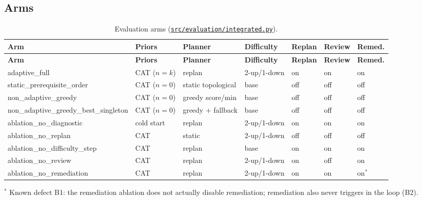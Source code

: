\documentclass[english]{sintr}
\newcommand{\repourl}{https://github.com/Bhuvan-56/adaptive-learning-path-planner-DAT}
\newcommand{\sha}{cs5903-final-2026}
\DeclareRobustCommand{\rf}[1]{\href{\repourl/blob/\sha/#1}{\nolinkurl{#1}}}
\begin{document}
\subsection{Arms}
{\small
\begin{longtable}{|L{3.6cm}|L{1.75cm}|L{2.2cm}|L{1.75cm}|C{1.2cm}|C{1.2cm}|C{1.25cm}|}
\caption{Evaluation arms (\rf{src/evaluation/integrated.py}).}\\
\hline
\textbf{Arm} & \textbf{Priors} & \textbf{Planner} & \textbf{Difficulty} & \textbf{Replan} & \textbf{Review} & \textbf{Remed.} \\ \hline
\endfirsthead
\hline \textbf{Arm} & \textbf{Priors} & \textbf{Planner} & \textbf{Difficulty} & \textbf{Replan} & \textbf{Review} & \textbf{Remed.} \\ \hline
\endhead
adaptive\_\allowbreak full & CAT ($n=k$) & replan & 2-up/1-down & on & on & on \\ \hline
static\_\allowbreak prerequisite\_\allowbreak order & CAT ($n=0$) & static topological & base & off & off & off \\ \hline
non\_\allowbreak adaptive\_\allowbreak greedy & CAT ($n=0$) & greedy score/min & base & off & off & off \\ \hline
non\_\allowbreak adaptive\_\allowbreak greedy\_\allowbreak best\_\allowbreak singleton & CAT ($n=0$) & greedy + fallback & base & off & off & off \\ \hline
ablation\_\allowbreak no\_\allowbreak diagnostic & cold start & replan & 2-up/1-down & on & on & on \\ \hline
ablation\_\allowbreak no\_\allowbreak replan & CAT & static & 2-up/1-down & off & off & off \\ \hline
ablation\_\allowbreak no\_\allowbreak difficulty\_\allowbreak step & CAT & replan & base & on & on & on \\ \hline
ablation\_\allowbreak no\_\allowbreak review & CAT & replan & 2-up/1-down & on & off & on \\ \hline
ablation\_\allowbreak no\_\allowbreak remediation & CAT & replan & 2-up/1-down & on & on & on$^*$ \\ \hline
\end{longtable}
}
{\footnotesize $^*$ Known defect B1: the remediation ablation does not actually disable remediation; remediation also never triggers in the loop (B2).}
\end{document}
